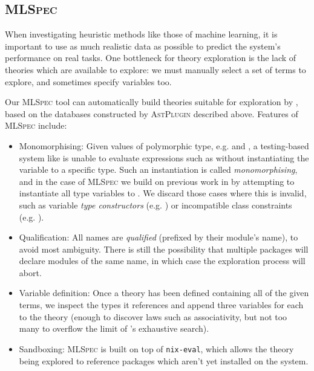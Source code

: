 \subsection{\textsc{MLSpec}}\label{mlspec}

When investigating heuristic methods like those of machine learning, it is important to use as much realistic data as possible to predict the system's performance on real tasks. One bottleneck for theory exploration is the lack of theories which are available to explore: we must manually select a set of terms to explore, and sometimes specify variables too.

Our \textsc{MLSpec} tool can automatically build theories suitable for exploration by \qspec{}, based on the databases constructed by \textsc{AstPlugin} described above. Features of \textsc{MLSpec} include:

\begin{itemize}
  \item{Monomorphising}: Given values of polymorphic type, e.g.  and , a testing-based system like \qspec{} is unable to evaluate expressions such as  without instantiating the variable  to a specific type. Such an instantiation is called \emph{monomorphising}, and in the case of \textsc{MLSpec} we build on previous work in \qcheck{} by attempting to instantiate all type variables to . We discard those cases where this is invalid, such as variable \emph{type constructors} (e.g. ) or incompatible class constraints (e.g. ).

  \item{Qualification}: All names are \emph{qualified} (prefixed by their module's name), to avoid most ambiguity. There is still the possibility that multiple packages will declare modules of the same name, in which case the exploration process will abort.

  \item{Variable definition}: Once a \qspec{} theory has been defined containing all of the given terms, we inspect the types it references and append three variables for each to the theory (enough to discover laws such as associativity, but not too many to overflow the limit of \qspec{}'s exhaustive search).

  \item{Sandboxing}: \textsc{MLSpec} is built on top of \texttt{nix-eval}, which allows the theory being explored to reference packages which aren't yet installed on the system.

\end{itemize}

